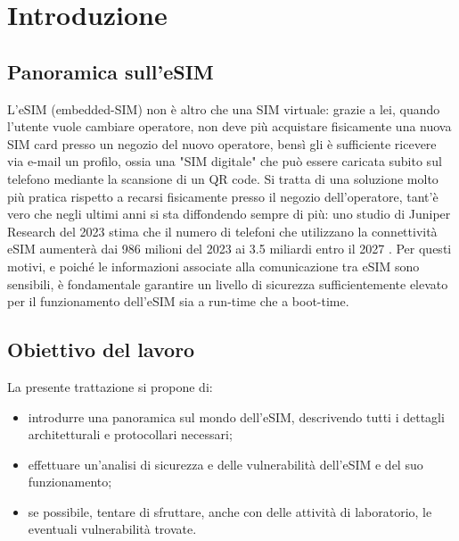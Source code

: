 \documentclass[10pt, oneside]{book}
\begin{document}
\tableofcontents
\listoffigures
\listoftables

\chapter{Introduzione}
\section{Panoramica sull'eSIM}
L'eSIM (embedded-SIM) non è altro che una SIM virtuale: grazie a lei, quando l'utente vuole cambiare operatore, non deve più acquistare fisicamente una nuova SIM card presso un negozio del nuovo operatore, bensì gli è sufficiente ricevere via e-mail un profilo, ossia una "SIM digitale" che può essere caricata subito sul telefono mediante la scansione di un QR code. Si tratta di una soluzione molto più pratica rispetto a recarsi fisicamente presso il negozio dell'operatore, tant'è vero che negli ultimi anni si sta diffondendo sempre di più: uno studio di Juniper Research del 2023 stima che il numero di telefoni che utilizzano la connettività eSIM aumenterà dai 986 milioni del 2023 ai 3.5 miliardi entro il 2027 \cite{Corcom}. Per questi motivi, e poiché le informazioni associate alla comunicazione tra eSIM sono sensibili, è fondamentale garantire un livello di sicurezza sufficientemente elevato per il funzionamento dell'eSIM sia a run-time che a boot-time.

\section{Obiettivo del lavoro}
La presente trattazione si propone di:
\begin{itemize}
\item introdurre una panoramica sul mondo dell'eSIM, descrivendo tutti i dettagli architetturali e protocollari necessari;
\item effettuare un'analisi di sicurezza e delle vulnerabilità dell'eSIM e del suo funzionamento;
\item se possibile, tentare di sfruttare, anche con delle attività di laboratorio, le eventuali vulnerabilità trovate.
\end{itemize}
\end{document}
